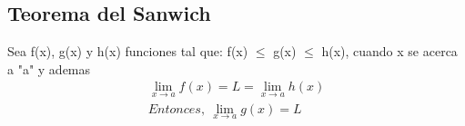 \documentclass{article}
\begin{document}
\subsection{Teorema del Sanwich}
Sea f(x), g(x) y h(x) funciones tal que: f(x) $\leq$ g(x) $\leq$ h(x), cuando x se acerca a "a" 
y ademas \begin{equation}\begin{aligned}
    \lim_{x\rightarrow a}f(x) = L = \lim_{x\rightarrow a}h(x) \\
 Entonces, \
    \lim_{x\rightarrow a} g(x) = L
\end{aligned}
\end{equation}
\end{document}
